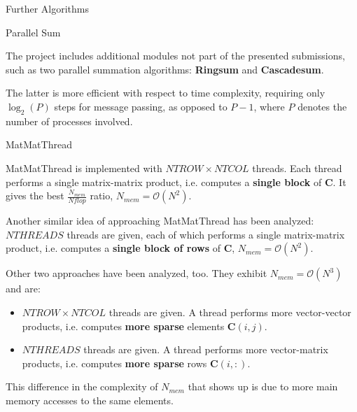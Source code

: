 \begin{chapter}{Further Algorithms}
    \begin{section}{Parallel Sum}
        \par The project includes additional modules not part of the presented submissions, such as two parallel summation algorithms: \textbf{Ringsum} and \textbf{Cascadesum}.
        \par The latter is more efficient with respect to time complexity, requiring only $\log_2(P)$ steps for message passing, as opposed to $P - 1$, where $P$ denotes the number of processes involved.
    \end{section}
    \begin{section}{MatMatThread}
        \par MatMatThread is implemented with $NTROW \times NTCOL$ threads. Each thread performs a single matrix-matrix product, i.e. computes a \textbf{single block} of $\mathbf{C}$. It gives the best $\frac{N_{mem}}{N{flop}}$ ratio, $N_{mem} = \mathcal{O}(N^2)$.
        \par Another similar idea of approaching MatMatThread has been analyzed: $NTHREADS$ threads are given, each of which performs a single matrix-matrix product, i.e. computes a \textbf{single block of rows} of $\mathbf{C}$, $N_{mem} = \mathcal{O}(N^2)$.\\
        \par Other two approaches have been analyzed, too. They exhibit $N_{mem} = \mathcal{O}(N^3)$ and are:
        \begin{itemize}
            \item $NTROW \times NTCOL$ threads are given. A thread performs more vector-vector products, i.e. computes \textbf{more sparse} elements $\mathbf{C}(i,j)$.
            \item $NTHREADS$ threads are given. A thread performs more vector-matrix products, i.e. computes \textbf{more sparse} rows $\mathbf{C}(i,:)$.
        \end{itemize}
        This difference in the complexity of $N_{mem}$ that shows up is due to more main memory accesses to the same elements.
    \end{section}
\end{chapter}